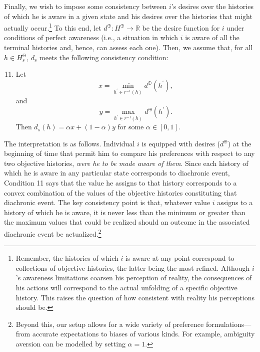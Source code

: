 \documentclass[
11pt,
titlepage,
reqno,
]{article}%
\theoremstyle{definition}
\begin{document}
Finally, we wish to impose some consistency between $i$'s desires over the histories of which he is aware in a given state and his desires over the histories that might actually occur.\footnote
{
	Remember, the histories of which $i$ is aware at any point correspond to collections of objective histories, the latter being the most refined. 
	Although $i$'s awareness limitations coarsen his perception of reality, the consequences of his actions will correspond to the actual unfolding of a specific objective history. 
	This raises the question of how consistent with reality his perceptions should be.
}
To this end, let $d^\oplus:H^\oplus\rightarrow \mathbb{R}$ be the desire function for $i$ under conditions of perfect awareness (i.e., a situation in which $i$ is aware of all the terminal histories and, hence, can assess each one).
Then, we assume that, for all $h\in H^\ominus_s$, $d_s$ meets the following consistency condition:
\begin{enumerate}
	\setcounter{enumi}{10}
	\item Let 
	\[
		x=\min_{h^\prime\in r^{-1}(h)}d^\oplus(h^\prime),
	\]
	 and  
	 \[
	 	y=\max_{h^\prime\in r^{-1}(h)}d^\oplus(h^\prime).
	 \]
	 Then $d_s(h)=\alpha x + (1-\alpha)y$ for some $\alpha\in[0,1]$.
\end{enumerate}
The interpretation is as follows. Individual $i$ is equipped with desires ($d^\oplus$) at the beginning of time that permit him to compare his preferences with respect to any two objective histories, \textit{were he to be made aware of them}.
Since each history of which he is aware in any particular state corresponds to diachronic event, Condition 11 says that the value he assigns to that history corresponds to a convex combination of the values of the objective histories constituting that diachronic event. 
The key consistency point is that, whatever value $i$ assigns to a history of which he is aware, it is never less than the minimum or greater than the maximum values that could be realized should an outcome in the associated diachronic event be actualized.\footnote
{
	Beyond this, our setup allows for a wide variety of preference formulations---from accurate expectations to biases of various kinds. For example, ambiguity aversion can be modelled by setting $\alpha=1$.
} 
\end{document}
